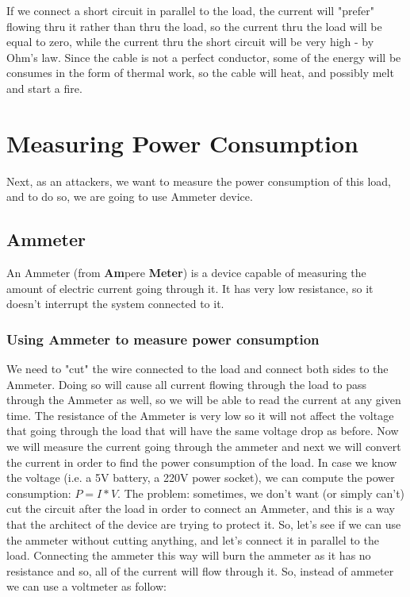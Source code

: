 If we connect a short circuit in parallel to the load, the current will "prefer" flowing thru it rather than thru the load, so the current thru the load will be equal to zero, while the current thru the short circuit will be very high - by Ohm's law.
Since the cable is not a perfect conductor, some of the energy will be consumes in the form of thermal work, so the cable will heat, and possibly melt and start a fire.
\section{Measuring Power Consumption}
Next, as an attackers, we want to measure the power consumption of this load, and to do so, we are going to use Ammeter device.
\subsection{Ammeter}
An Ammeter (from \textbf{Am}pere \textbf{Meter}) is a device capable of measuring the amount of electric current going through it. It has very low resistance, so it doesn't interrupt the system connected to it.
\subsubsection{Using Ammeter to measure power consumption}
We need to "cut" the wire connected to the load and connect both sides to the Ammeter.
Doing so will cause all current flowing through the load to pass through the Ammeter as well, so we will be able to read the current at any given time. The resistance of the Ammeter is very low so it will not affect the voltage that going through the load that will have the same voltage drop as before. 
Now we will measure the current going through the ammeter and next we will convert the current in order to find the power consumption of the load.
In case we know the voltage (i.e. a 5V battery, a 220V power socket), we can compute the power consumption: $P=I*V$.
The problem: sometimes, we don't want (or simply can't) cut the circuit after the load in order to connect an Ammeter, and this is a way that the architect of the device are trying to protect it. So, let’s see if we can use the ammeter without cutting anything, and let’s connect it in parallel to the load.
Connecting the ammeter this way will burn the ammeter as it has no resistance and so, all of the current will flow through it. So, instead of ammeter we can use a voltmeter as follow:

